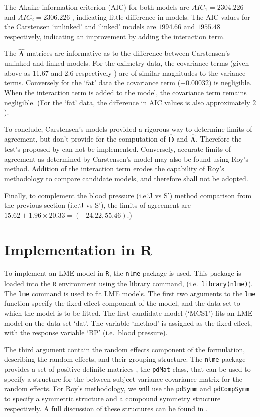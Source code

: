\documentclass[MAIN.tex]{subfiles}
\begin{document}
	The Akaike information criterion (AIC) for both models are $AIC_{1} = 2304.226$ and $AIC_{2} = 2306.226$ , indicating little difference in models. The AIC values for the Carstensen `unlinked' and `linked' models are $1994.66$ and $1955.48$ respectively, indicating an improvement by adding the interaction term.
	
	The $\boldsymbol{\hat{\Lambda}}$ matrices are informative as to the difference between Carstensen's unlinked and linked models. For the oximetry data, the covariance terms (given above as 11.67 and 2.6 respectively ) are of similar magnitudes to the variance terms. Conversely for the `fat' data the covariance term ($-0.00032$) is negligible. When the interaction term is added to the model, the covariance term remains negligible. (For the `fat' data, the difference in AIC values is also approximately $2$).
	
	To conclude, Carstensen's models provided a rigorous way to determine limits of agreement, but don't provide for the computation of $\boldsymbol{\hat{D}}$ and $\boldsymbol{\hat{\Lambda}}$. Therefore the test's proposed by \citet{roy} can not be implemented. Conversely, accurate limits of agreement as determined by Carstensen's model may also be found using Roy's method. Addition of the interaction term erodes the capability of Roy's methodology to compare candidate models, and therefore shall not be adopted.
	
	Finally, to complement the blood pressure (i.e.`J vs S') method comparison from the previous section (i.e.`J vs S'), the limits of agreement are $15.62 \pm 1.96 \times 20.33 = (-24.22, 55.46)$.)
	\newpage
	\section{Implementation in R}
	To implement an LME model in \texttt{R}, the \texttt{nlme} package is used. This package is loaded into the \texttt{R} environment using the library command, (i.e.\ \texttt{library(nlme)}). The \texttt{lme} command is used to fit LME models. The first two arguments to the \texttt{lme} function specify the fixed effect component of the model, and the data set to which the model is to be fitted. The first candidate model (`MCS1') fits an LME model on the data set `dat'. The variable `method' is assigned as the fixed effect, with the response variable `BP' (i.e.\ blood pressure).
	
	The third argument contain the random effects component of the formulation, describing the random effects, and their grouping structure. The \texttt{nlme} package provides a set of positive-definite matrices , the \texttt{pdMat} class, that can be used to specify a structure for the between-subject variance-covariance matrix for the random effects. For Roy's methodology, we will use the \texttt{pdSymm} and \texttt{pdCompSymm} to specify a symmetric structure and a compound symmetry structure respectively. A full discussion of these structures can be found in \citet[pg. 158]{PB}.
	
\end{document}
